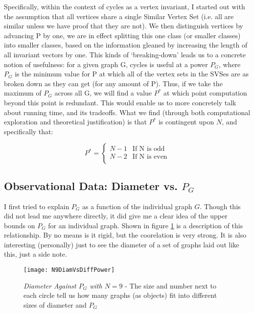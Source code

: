 Specifically, within the context of cycles as a vertex invariant, I started out with the assumption that all vertices share a single Similar Vertex Set (i.e. all are similar unless we have proof that they are not).
We then distinguish vertices by advancing P by one, we are in effect splitting this one class (or smaller classes) into smaller classes, based on the information gleaned by increasing the length of all invariant vectors by one.
This kinds of `breaking-down' leads us to a concrete notion of usefulness: for a given graph G, cycles is useful at a power $P_G$, where $P_G$ is the minimum value for P at which all of the vertex sets in the SVSes are as broken down as they can get (for any amount of P).
Thus, if we take the maximum of $P_G$ across all G, we will find a value $P^*$ at which point computation beyond this point is redundant.
This would enable us to more concretely talk about running time, and its tradeoffs.
What we find (through both computational exploration and theoretical justification) is that $P^*$ is contingent upon $N$, and specifically that:

\[ P^* = \begin{cases} 
      N-1 & \text{If N is odd} \\
      N-2 & \text{If N is even} \\
   \end{cases}
\]

\subsection{Observational Data: Diameter vs. $P_G$}

I first tried to explain $P_G$ as a function of the individual graph $G$.
Though this did not lead me anywhere directly, it did give me a clear idea of the upper bounds on $P_G$ for an individual graph.
Shown in figure \ref{fig:diamvsmaxpower} is a description of this relationship.  By no means is it rigid, but the coorelation is very strong.
It is also interesting (personally) just to see the diameter of a set of graphs laid out like this, just a side note.

\begin{figure}[h]
\label{fig:diamvsmaxpower}
\caption{\emph{Diameter Against $P_G$ with $N=9$} - The size and number next to each circle tell us how many graphs (as objects) fit into different sizes of diameter and $P_G$}
\centering
\texttt{[image: N9DiamVsDiffPower]}
\end{figure}

